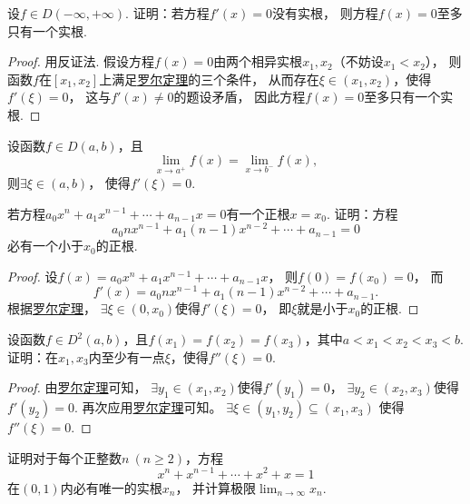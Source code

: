 \begin{example}
设\(f \in D(-\infty,+\infty)\).
证明：若方程\(f'(x) = 0\)没有实根，
则方程\(f(x) = 0\)至多只有一个实根.
\begin{proof}
用反证法.
假设方程\(f(x) = 0\)由两个相异实根\(x_1,x_2\)（不妨设\(x_1 < x_2\)），
则函数\(f\)在\([x_1,x_2]\)上满足\hyperref[theorem:微分中值定理.罗尔定理]{罗尔定理}的三个条件，
从而存在\(\xi\in(x_1,x_2)\)，使得\(f'(\xi) = 0\)，
这与\(f'(x) \neq 0\)的题设矛盾，
因此方程\(f(x) = 0\)至多只有一个实根.
\end{proof}
\end{example}

\begin{corollary}
设函数\(f \in D(a,b)\)，且\[
	\lim_{x \to a^+} f(x)
	= \lim_{x \to b^-} f(x),
\]
则\(\exists\xi\in(a,b)\)，
使得\(f'(\xi) = 0\).
\end{corollary}

\begin{example}\label{example:微分中值定理.一元高次方程的根的存在性}
若方程\(a_0 x^n + a_1 x^{n-1} + \dotsb + a_{n-1} x = 0\)有一个正根\(x = x_0\).
证明：方程\[
	a_0 n x^{n-1} + a_1 (n-1) x^{n-2} + \dotsb + a_{n-1} = 0
\]必有一个小于\(x_0\)的正根.
\begin{proof}
设\(f(x) = a_0 x^n + a_1 x^{n-1} + \dotsb + a_{n-1} x\)，
则\(f(0) = f(x_0) = 0\)，
而\[
	f'(x) = a_0 n x^{n-1} + a_1 (n-1) x^{n-2} + \dotsb + a_{n-1}.
\]
根据\hyperref[theorem:微分中值定理.罗尔定理]{罗尔定理}，
\(\exists \xi \in (0,x_0)\)使得\(f'(\xi) = 0\)，
即\(\xi\)就是小于\(x_0\)的正根.
\end{proof}
\end{example}
\begin{example}
设函数\(f \in D^2(a,b)\)，且\(f(x_1) = f(x_2) = f(x_3)\)，其中\(a < x_1 < x_2 < x_3 < b\).
证明：在\(x_1,x_3\)内至少有一点\(\xi\)，使得\(f''(\xi) = 0\).
\begin{proof}
由\hyperref[theorem:微分中值定理.罗尔定理]{罗尔定理}可知，
\(\exists y_1\in(x_1,x_2)\)使得\(f'(y_1) = 0\)，
\(\exists y_2\in(x_2,x_3)\)使得\(f'(y_2) = 0\).
再次应用\hyperref[theorem:微分中值定理.罗尔定理]{罗尔定理}可知。
\(\exists \xi\in(y_1,y_2)\subseteq(x_1,x_3)\)
使得\(f''(\xi) = 0\).
\end{proof}
\end{example}
\begin{example}
证明对于每个正整数\(n\ (n\geq2)\)，方程\[
	x^n + x^{n-1} + \dotsb + x^2 + x = 1
\]在\((0,1)\)内必有唯一的实根\(x_n\)，
并计算极限\(\lim_{n\to\infty} x_n\).
\end{example}

